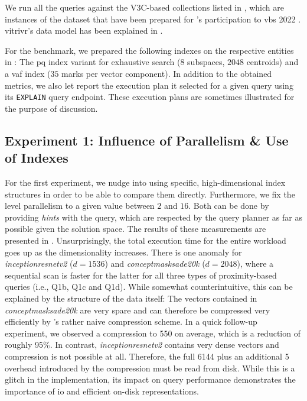 We run all the queries against the V3C-based collections listed in , which are instances of the dataset that have been prepared for \vitrivr{}'s \cite{Rossetto:2016Vitrivr,Gasser:2019Multimodal} participation to \acrshort{vbs} 2022 \cite{Heller:2022Multi}. vitrivr's data model has been explained in . 

For the benchmark, we prepared the following indexes on the respective entities in \cottontail{}: The \acrshort{pq} index variant for exhaustive search ($8$ subspaces, $2048$ centroids) and a \acrshort{vaf} index ($35$ marks per vector component). In addition to the obtained metrics, we also let \cottontail{} report the execution plan it selected for a given query using its \texttt{EXPLAIN} query endpoint. These execution plans are sometimes illustrated for the purpose of discussion.

\subsection{Experiment 1: Influence of Parallelism \& Use of Indexes}
For the first experiment, we nudge \cottontail{} into using specific, high-dimensional index structures in order to be able to compare them directly. Furthermore, we fix the level parallelism to a given value between $2$ and $16$. Both can be done by providing \emph{hints} with the query, which are respected by the query planner as far as possible given the solution space. The results of these measurements are presented in . Unsurprisingly, the total execution time for the entire workload goes up as the dimensionality increases. There is one anomaly for \emph{inceptionresnetv2} ($d = 1536$) and \emph{conceptmasksade20k} ($d = 2048$), where a sequential scan is faster for the latter for all three types of proximity-based queries (i.e., Q1b, Q1c and Q1d). While somewhat counterintuitive, this can be explained by the structure of the data itself: The vectors contained in \emph{conceptmasksade20k} are very spare and can therefore be compressed very efficiently by \cottontail{}'s rather naive compression scheme. In a quick follow-up experiment, we observed a compression to \SI{550}{\byte} on average, which is a reduction of roughly 95\%. In contrast, \emph{inceptionresnetv2} contains very dense vectors and compression is not possible at all. Therefore, the full \SI{6144}{\byte} plus an additional \SI{5}{\byte} overhead introduced by the compression must be read from disk. While this is a glitch in the implementation, its impact on query performance demonstrates the importance of \acrshort{io} and efficient on-disk representations.

